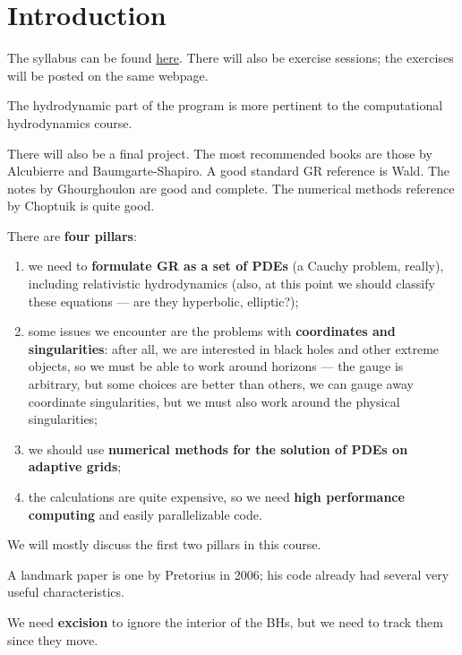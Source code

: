 \documentclass[main.tex]{subfiles}
\begin{document}
\section*{Introduction}


The syllabus can be found \href{http://sbernuzzi.gitpages.tpi.uni-jena.de/nr/}{here}.
There will also be exercise sessions; the exercises will be posted on the same webpage. 

The hydrodynamic part of the program is more pertinent to the computational hydrodynamics course. 

There will also be a final project. 
The most recommended books are those by Alcubierre and Baumgarte-Shapiro.
A good standard GR reference is Wald. 
The notes by Ghourghoulon are good and complete. 
The numerical methods reference by Choptuik is quite good. 

There are \textbf{four pillars}: 
\begin{enumerate}
    \item we need to \textbf{formulate GR as a set of PDEs} (a Cauchy problem, really), including relativistic hydrodynamics (also, at this point we should classify these equations --- are they hyperbolic, elliptic?);
    \item some issues we encounter are the problems with \textbf{coordinates and singularities}: after all, we are interested in black holes and other extreme objects, so we must be able to work around horizons --- the gauge is arbitrary, but some choices are better than others, we can gauge away coordinate singularities, but we must also work around the physical singularities;
    \item we should use \textbf{numerical methods for the solution of PDEs on adaptive grids}; 
    \item the calculations are quite expensive, so we need \textbf{high performance computing} and easily parallelizable code.
\end{enumerate}

We will mostly discuss the first two pillars in this course. 

A landmark paper is one by Pretorius in 2006; his code already had several very useful characteristics.

We need \textbf{excision} to ignore the interior of the BHs, but we need to track them since they move. 
\end{document}

